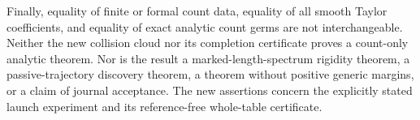Finally, equality of finite or formal count data, equality of all smooth
Taylor coefficients, and equality of exact analytic count germs are not
interchangeable. Neither the new collision cloud nor its completion
certificate proves a count-only analytic theorem. Nor is the result a
marked-length-spectrum rigidity theorem, a passive-trajectory discovery
theorem, a theorem without positive generic margins, or a claim of
journal acceptance. The new assertions concern the explicitly stated
launch experiment and its reference-free whole-table certificate.
